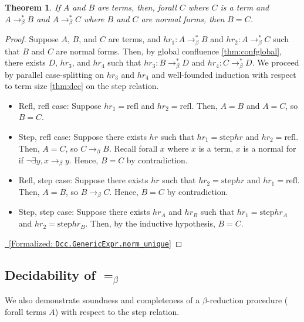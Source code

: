 \documentclass{article}
\newcommand{\lean}[1]{\EscVerb{#1}}
\newtheorem{theorem}{Theorem}
\newcommand{\leanlink}[2]{
  \hfill \href{#1}{\textcolor{leanblue}\faCheckSquare~[Formalized: \texttt{#2}]}%
}
\newcommand{\arr}{\rightarrow}
\newcommand{\barr}{\arr_{\beta}}
\begin{document}
\begin{theorem} \label{thm:unf}
  If \(A\) and \(B\) are terms, then, forall \(C\) where \(C\) is a term and \(A \barr^{*} B\) and \(A \barr^{*} C\) where \(B\) and \(C\) are normal forms, then \(B = C\).
\end{theorem}

\begin{proof}
Suppose \(A\), \(B\), and \(C\) are terms, and \(hr_{1} : A \barr^{*} B\) and \(hr_{2} : A \barr^{*} C\) such that \(B\) and \(C\) are normal forms. Then, by global confluence \ref{thm:confglobal}, there exists \(D\), \(hr_{3}\), and \(hr_{4}\) such that \(hr_{3} : B \barr^{*} D\) and \(hr_{4} : C \barr^{*} D\). We proceed by parallel case-splitting on \(hr_{3}\) and \(hr_{4}\) and well-founded induction with respect to term size \ref{thm:dec} on the step relation.

\begin{itemize}
  \item Refl, refl case:
    Suppose \(hr_{1} = \text{refl}\) and \(hr_{2} = \text{refl}\). Then, \(A = B\) and \(A = C\), so \(B = C\).
  \item Step, refl case:
    Suppose there exists \(hr\) such that \(hr_{1} = \text{step} hr\) and \(hr_{2} = \text{refl}\). Then, \(A = C\), so \(C \barr B\). Recall forall \(x\) where \(x\) is a term, \(x\) is a normal for if \(\neg \exists y, x \barr y\). Hence, \(B = C\) by contradiction.
  \item Refl, step case:
    Suppose there exists \(hr\) such that \(hr_{2} = \text{step} hr\) and \(hr_{1} = \text{refl}\). Then, \(A = B\), so \(B \barr C\). Hence, \(B = C\) by contradiction.
  \item Step, step case:
    Suppose there exists \(hr_{A}\) and \(hr_{B}\) such that \(hr_{1} = \text{step} hr_{A}\) and \(hr_{2} = \text{step} hr_{B}\). Then, by the inductive hypothesis, \(B = C\).
  \end{itemize}
  \noindent \hfill\leanlink{https://github.com/lexzaiello/DCC/blob/7b316fc3eb8aac4736e30d5e9a58918d5215c334/Dcc/Relation.lean\#L366}{Dcc.GenericExpr.norm\_unique}
\end{proof}

\subsection{Decidability of \(=_{\beta}\)}

We also demonstrate soundness and completeness of a \(\beta\)-reduction procedure (\lean{reduce RedAff A} forall terms \(A\)) with respect to the step relation.
\end{document}
